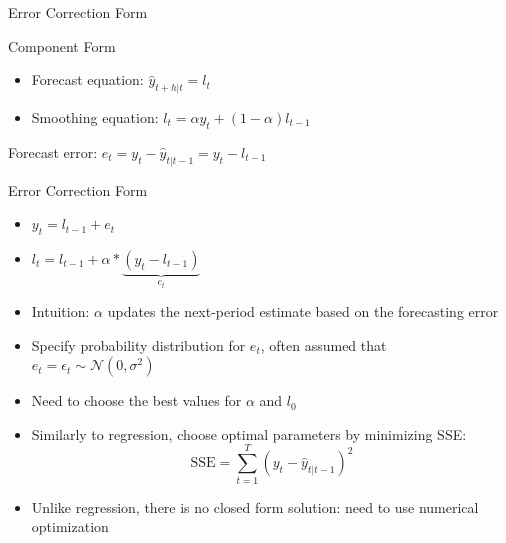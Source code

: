 \documentclass{beamer}
\begin{document}
\begin{frame}{Error Correction Form}
  \begin{exampleblock}{Component Form}
    \begin{itemize}
    \item Forecast equation: $\hat{y}_{t+h |t} = l_t$
    \item Smoothing equation: $l_t = \alpha y_t + (1-\alpha)l_{t-1}$
    \end{itemize}
  \end{exampleblock}

  Forecast error: $e_t = y_t - \hat{y}_{t|t-1} = y_t - l_{t-1}$
  
  \begin{block}{Error Correction Form}
    \begin{itemize}
    \item $y_t = l_{t-1} + e_t$
    \item $l_t = l_{t-1} + \alpha*\underbrace{(y_t - l_{t-1})}_{e_t}$
    \end{itemize}

    \begin{itemize}
    \item Intuition: $\alpha$ updates the next-period estimate based on the forecasting error
    \item Specify probability distribution for $e_t$, often assumed that $e_t = \epsilon_t \sim \mathcal{N}(0, \sigma^2)$
    \end{itemize}
           
  \end{block}
  
\end{frame}


\begin{frame}
  \begin{itemize}
  \item Need to choose the best values for $\alpha$ and $l_0$
  \item Similarly to regression, choose optimal parameters by minimizing SSE:
    \begin{equation*}
      \text{SSE} = \sum_{t=1}^T (y_t - \hat{y}_{t|t-1})^2
    \end{equation*}
  \item Unlike regression, there is no closed form solution: need to use numerical optimization
  \end{itemize}
\end{frame}
\end{document}
